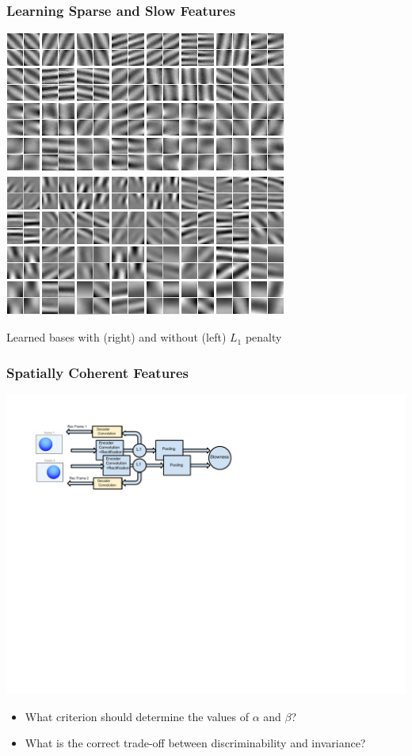 \documentclass{beamer}
\begin{document}
\begin{frame}
\frametitle{Learning Sparse and Slow Features} 
\begin{center} 
\includegraphics[scale=0.33]{./images/TAE/slow_dec_pooling_sub.png} \hspace{0.5cm} 
\includegraphics[scale=0.33]{./images/TAE/slow_dec_l1_pooling.png}
\end{center} 
\centerline{Learned bases with (right) and without (left) $L_1$ penalty} 
\end{frame}

\begin{frame}
\frametitle{Spatially Coherent Features} 
\centerline{\includegraphics[scale=0.6,trim = 20 350 300 50, clip]{./images/TAE/diagram.pdf}} 
\begin{itemize}
\item What criterion should determine the values of $\alpha$ and $\beta$? 
\item What is the correct trade-off between discriminability and invariance? 
\end{itemize} 
\end{frame}
\end{document}
